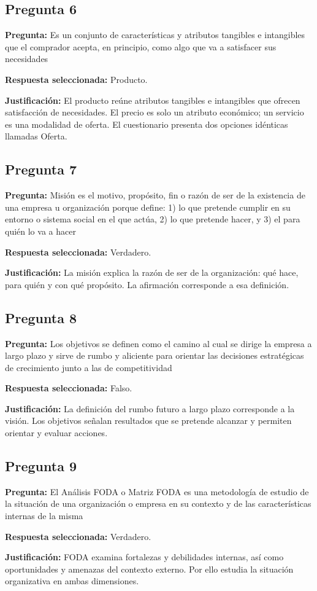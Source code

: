 {\subsection{Pregunta 6}
\textbf{Pregunta:} Es un conjunto de características y atributos tangibles e intangibles que el comprador acepta, en principio, como algo que va a satisfacer sus necesidades
\par\textbf{Respuesta seleccionada:} Producto.
\par\textbf{Justificación:} El producto reúne atributos tangibles e intangibles que ofrecen satisfacción de necesidades. El precio es solo un atributo económico; un servicio es una modalidad de oferta. El cuestionario presenta dos opciones idénticas llamadas Oferta.
\subsection{Pregunta 7}
\textbf{Pregunta:} Misión es el motivo, propósito, fin o razón de ser de la existencia de una empresa u organización porque define: 1) lo que pretende cumplir en su entorno o sistema social en el que actúa, 2) lo que pretende hacer, y 3) el para quién lo va a hacer
\par\textbf{Respuesta seleccionada:} Verdadero.
\par\textbf{Justificación:} La misión explica la razón de ser de la organización: qué hace, para quién y con qué propósito. La afirmación corresponde a esa definición.
\subsection{Pregunta 8}
\textbf{Pregunta:} Los objetivos se definen como el camino al cual se dirige la empresa a largo plazo y sirve de rumbo y aliciente para orientar las decisiones estratégicas de crecimiento junto a las de competitividad
\par\textbf{Respuesta seleccionada:} Falso.
\par\textbf{Justificación:} La definición del rumbo futuro a largo plazo corresponde a la visión. Los objetivos señalan resultados que se pretende alcanzar y permiten orientar y evaluar acciones.
\subsection{Pregunta 9}
\textbf{Pregunta:} El Análisis FODA o Matriz FODA es una metodología de estudio de la situación de una organización o empresa en su contexto y de las características internas de la misma
\par\textbf{Respuesta seleccionada:} Verdadero.
\par\textbf{Justificación:} FODA examina fortalezas y debilidades internas, así como oportunidades y amenazas del contexto externo. Por ello estudia la situación organizativa en ambas dimensiones.
}
